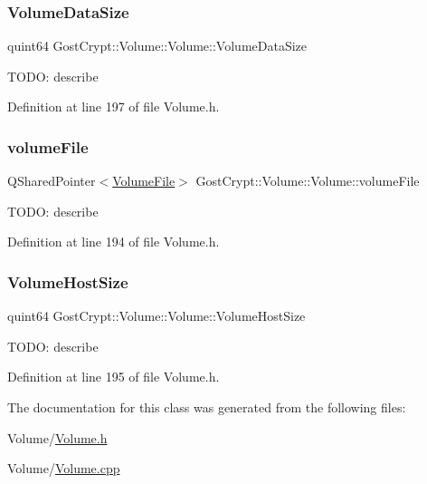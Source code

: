\subsubsection{\texorpdfstring{Volume\+Data\+Size}{VolumeDataSize}}
{\footnotesize\ttfamily quint64 Gost\+Crypt\+::\+Volume\+::\+Volume\+::\+Volume\+Data\+Size\hspace{0.3cm}{\ttfamily [protected]}}

T\+O\+DO\+: describe 

Definition at line 197 of file Volume.\+h.

\mbox{\label{class_gost_crypt_1_1_volume_1_1_volume_a6e7515f849c7299e713b4c0194091d4e}} 
\subsubsection{\texorpdfstring{volume\+File}{volumeFile}}
{\footnotesize\ttfamily Q\+Shared\+Pointer$<$\hyperlink{class_gost_crypt_1_1_volume_1_1_volume_file}{Volume\+File}$>$ Gost\+Crypt\+::\+Volume\+::\+Volume\+::volume\+File\hspace{0.3cm}{\ttfamily [protected]}}

T\+O\+DO\+: describe 

Definition at line 194 of file Volume.\+h.

\mbox{\label{class_gost_crypt_1_1_volume_1_1_volume_abe2b20305211a8835e276acda77627c9}} 
\subsubsection{\texorpdfstring{Volume\+Host\+Size}{VolumeHostSize}}
{\footnotesize\ttfamily quint64 Gost\+Crypt\+::\+Volume\+::\+Volume\+::\+Volume\+Host\+Size\hspace{0.3cm}{\ttfamily [protected]}}

T\+O\+DO\+: describe 

Definition at line 195 of file Volume.\+h.



The documentation for this class was generated from the following files\+:\begin{DoxyCompactItemize}
\item 
Volume/\hyperlink{_volume_8h}{Volume.\+h}\item 
Volume/\hyperlink{_volume_8cpp}{Volume.\+cpp}\end{DoxyCompactItemize}

